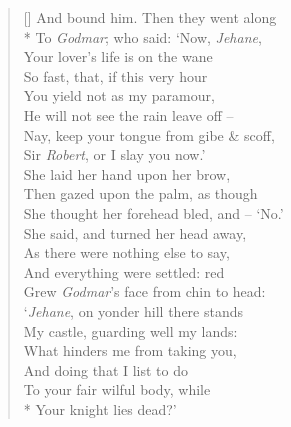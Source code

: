 \documentclass[MAIN]{subfiles}
\begin{document}
\begin{verse}[\versewidth]
{\color{white} And bound him.} Then they went along\\*
To \emph{Godmar}; who said: `Now, \emph{Jehane},\\
Your lover's life is on the wane\\
So fast, that, if this very hour\\
You yield not as my paramour,\\
He will not see the rain leave off --\\
Nay, keep your tongue from gibe \& scoff,\\
Sir \emph{Robert}, or I slay you now.'\\
She laid her hand upon her brow,\\
Then gazed upon the palm, as though\\
She thought her forehead bled, and -- `No.'\\
She said, and turned her head away,\\
As there were nothing else to say,\\
And everything were settled: red \\
Grew \emph{Godmar}'s face from chin to head:\\
`\emph{Jehane}, on yonder hill there stands\\
My castle, guarding well my lands:\\
What hinders me from taking you,\\
And doing that I list to do\\
To your fair wilful body, while\\*
Your knight lies dead?'\\


\end{verse}
\end{document}
